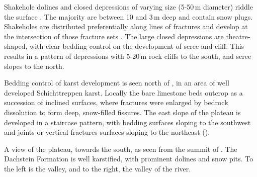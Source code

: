 Shakehole dolines and closed depressions of varying size (5-50\,m diameter) riddle the  surface . The majority are between 10 and 3\,m deep and contain snow plugs. Shakeholes are distributed preferentially along lines of fractures and develop at the intersection of those fracture sets . The large closed depressions are theatre-shaped, with clear bedding control on the development of scree and cliff. This results in a pattern of depressions with 5-20\,m rock cliffs to the south, and scree slopes to the north.

Bedding control of karst development is seen north of , in an area of well developed Schichttreppen karst. Locally the bare limestone beds outcrop as a succession of inclined surfaces, where fractures were enlarged by bedrock dissolution to form deep, snow-filled fissures. The east slope of the  plateau is developed in a staircase pattern, with bedding surfaces sloping to the southwest and joints or vertical fractures surfaces sloping to the northeast ().

\begin{pagefigure}
\checkoddpage \ifoddpage \forcerectofloat \else \forceversofloat \fi
{}
\caption{ A view of the  plateau, towards the south, as seen from the summit of .  The Dachstein Formation is well karstified, with prominent dolines and snow pits. To the left is the  valley, and to the right, the valley of the  river. }
\label{fig:karstic_landscape}
\end{pagefigure}

